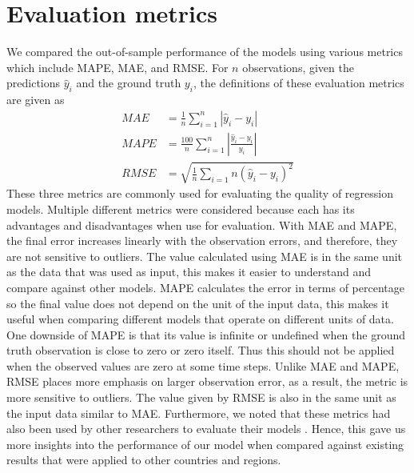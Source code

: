 \section{Evaluation metrics}
\label{sec:methodologies-evaluation-metrics}

We compared the out-of-sample performance of the models using various metrics which include \gls{MAPE}, \gls{MAE}, and \gls{RMSE}. For $n$ observations, given the predictions $\hat{y}_i$ and the ground truth $y_i$, the definitions of these evaluation metrics are given as
\begin{align*}
    MAE &= \frac{1}{n} \sum_{i=1}^n \left| \hat{y}_i - y_i \right| \\
    MAPE &= \frac{100}{n} \sum_{i=1}^n \left| \frac{\hat{y}_i - y_i}{y_i} \right| \\
    RMSE &= \sqrt{\frac{1}{n} \sum_{i=1}{n} (\hat{y}_i - y_i)^2}
\end{align*}
These three metrics are commonly used for evaluating the quality of regression models.
Multiple different metrics were considered because each has its advantages and disadvantages when use for evaluation.
With \gls{MAE} and \gls{MAPE}, the final error increases linearly with the observation errors, and therefore, they are not sensitive to outliers.
The value calculated using \gls{MAE} is in the same unit as the data that was used as input, this makes it easier to understand and compare against other models.
\gls{MAPE} calculates the error in terms of percentage so the final value does not depend on the unit of the input data, this makes it useful when comparing different models that operate on different units of data.
One downside of \gls{MAPE} is that its value is infinite or undefined when the ground truth observation is close to zero or zero itself.
Thus this should not be applied when the observed values are zero at some time steps.
Unlike \gls{MAE} and \gls{MAPE}, \gls{RMSE} places more emphasis on larger observation error, as a result, the metric is more sensitive to outliers.
The value given by \gls{RMSE} is also in the same unit as the input data similar to \gls{MAE}.
Furthermore, we noted that these metrics had also been used by other researchers to evaluate their models \cite{rayEnsembleForecastsCoronavirus2020, ihmecovid-19forecastingteamModelingCOVID19Scenarios2021,arikInterpretableSequenceLearning}.
Hence, this gave us more insights into the performance of our model when compared against existing results that were applied to other countries and regions.
